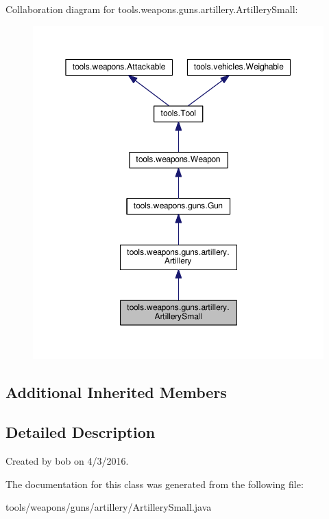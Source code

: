 Collaboration diagram for tools.\+weapons.\+guns.\+artillery.\+Artillery\+Small\+:
\nopagebreak
\begin{figure}[H]
\begin{center}
\leavevmode
\includegraphics[width=350pt]{classtools_1_1weapons_1_1guns_1_1artillery_1_1_artillery_small__coll__graph}
\end{center}
\end{figure}
\subsection*{Additional Inherited Members}


\subsection{Detailed Description}
Created by bob on 4/3/2016. 

The documentation for this class was generated from the following file\+:\begin{DoxyCompactItemize}
\item 
tools/weapons/guns/artillery/Artillery\+Small.\+java\end{DoxyCompactItemize}

